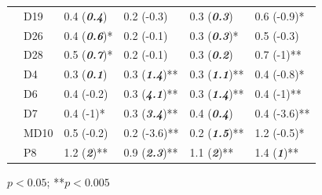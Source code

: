 \documentclass[journal = esthag, manuscript = article]{achemso}\usepackage[]{graphicx}\usepackage[]{color}
\begin{document}
\begin{table}[!tbp]
\begin{center}
\begin{tabular}{lllll}
~~D19&0.4 \footnotesize{(\textit{\textbf{0.4}})}&0.2 \footnotesize{(-0.3)}&0.3 \footnotesize{(\textit{\textbf{0.3}})}&0.6 \footnotesize{(-0.9)*}\tabularnewline
~~D26&0.4 \footnotesize{(\textit{\textbf{0.6}})*}&0.2 \footnotesize{(-0.1)}&0.3 \footnotesize{(\textit{\textbf{0.3}})*}&0.5 \footnotesize{(-0.3)}\tabularnewline
~~D28&0.5 \footnotesize{(\textit{\textbf{0.7}})*}&0.2 \footnotesize{(-0.1)}&0.3 \footnotesize{(\textit{\textbf{0.2}})}&0.7 \footnotesize{(-1)**}\tabularnewline
~~D4&0.3 \footnotesize{(\textit{\textbf{0.1}})}&0.3 \footnotesize{(\textit{\textbf{1.4}})**}&0.3 \footnotesize{(\textit{\textbf{1.1}})**}&0.4 \footnotesize{(-0.8)*}\tabularnewline
~~D6&0.4 \footnotesize{(-0.2)}&0.3 \footnotesize{(\textit{\textbf{4.1}})**}&0.3 \footnotesize{(\textit{\textbf{1.4}})**}&0.4 \footnotesize{(-1)**}\tabularnewline
~~D7&0.4 \footnotesize{(-1)*}&0.3 \footnotesize{(\textit{\textbf{3.4}})**}&0.4 \footnotesize{(\textit{\textbf{0.4}})}&0.4 \footnotesize{(-3.6)**}\tabularnewline
~~MD10&0.5 \footnotesize{(-0.2)}&0.2 \footnotesize{(-3.6)**}&0.2 \footnotesize{(\textit{\textbf{1.5}})**}&1.2 \footnotesize{(-0.5)*}\tabularnewline
~~P8&1.2 \footnotesize{(\textit{\textbf{2}})**}&0.9 \footnotesize{(\textit{\textbf{2.3}})**}&1.1 \footnotesize{(\textit{\textbf{2}})**}&1.4 \footnotesize{(\textit{\textbf{1}})**}\tabularnewline
\hline
\end{tabular}\end{center}

\footnotesize *$p<0.05$; **$p<0.005$\end{table}
\end{document}
